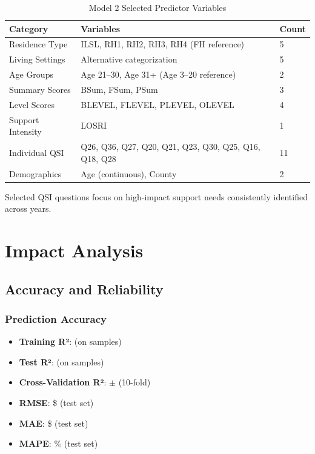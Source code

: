 \begin{table}[h]
\centering
\caption{Model 2 Selected Predictor Variables}
\begin{tabular}{lll}
\toprule
\textbf{Category} & \textbf{Variables} & \textbf{Count} \\
\midrule
Residence Type & ILSL, RH1, RH2, RH3, RH4 (FH reference) & 5 \\
Living Settings & Alternative categorization & 5 \\
Age Groups & Age 21--30, Age 31+ (Age 3--20 reference) & 2 \\
Summary Scores & BSum, FSum, PSum & 3 \\
Level Scores & BLEVEL, FLEVEL, PLEVEL, OLEVEL & 4 \\
Support Intensity & LOSRI & 1 \\
Individual QSI & Q26, Q36, Q27, Q20, Q21, Q23, Q30, Q25, Q16, Q18, Q28 & 11 \\
Demographics & Age (continuous), County & 2 \\
\bottomrule
\end{tabular}
\end{table}

Selected QSI questions focus on high-impact support needs consistently identified across years.

\section{Impact Analysis}

\subsection{Accuracy and Reliability}

\subsubsection{Prediction Accuracy}
\begin{itemize}
    \item \textbf{Training R²}: \ModelTwoRSquaredTrain{} (on \ModelTwoTrainingSamples{} samples)
    \item \textbf{Test R²}: \ModelTwoRSquaredTest{} (on \ModelTwoTestSamples{} samples)
    \item \textbf{Cross-Validation R²}: \ModelTwoCVMean{} $\pm$ \ModelTwoCVStd{} (10-fold)
    \item \textbf{RMSE}: \$\ModelTwoRMSETest{} (test set)
    \item \textbf{MAE}: \$\ModelTwoMAETest{} (test set)
    \item \textbf{MAPE}: \ModelTwoMAPETest{}\% (test set)
\end{itemize}

